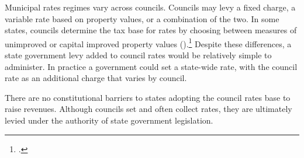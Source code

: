 \documentclass[twoside,english]{Dianab5ona4portrait}
\begin{document}
Municipal rates regimes vary across councils. Councils may levy a fixed charge, a variable rate based on property values, or a combination of the two. In some states, councils determine the tax base for rates by choosing between measures of unimproved or capital improved property values ().\footcite[][198]{productivity2008assessing}  Despite these differences, a state government levy added to council rates would be relatively simple to administer. In practice a government could set a state-wide rate, with the council rate as an additional charge that varies by council.

There are no constitutional barriers to states adopting the council rates base to raise revenues. Although councils set and often collect rates, they are ultimately levied under the authority of state government legislation. 
\end{document}

